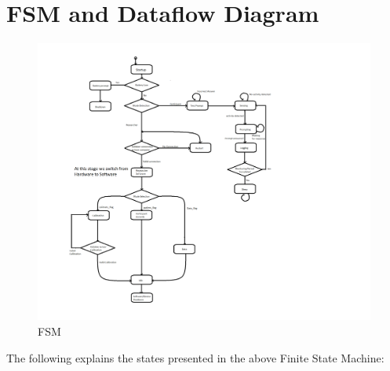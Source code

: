 \documentclass[12pt]{article}
\begin{document}
\section{FSM and Dataflow Diagram}
\label{FSM_Dataflow}
\begin{figure}[h!]
	\begin{center}
		 \includegraphics[width=1.3\textwidth]{FSM}
		\caption{FSM}
		\label{Fig_FSM} 
	\end{center}
\end{figure}
The following explains the states presented in the above Finite State Machine:
\end{document}
